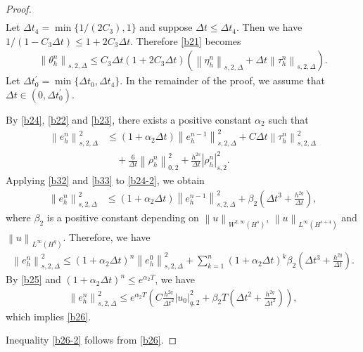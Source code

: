 \documentclass[10pt,a4paper,tbtags,leqno]{amsart}
\theoremstyle{definition}
\numberwithin{equation}{section}
\def\norm#1#2{\left\|#2\right\|_{#1}}
\def\snorm#1#2{\left|#2\right|_{#1}}
\begin{document}
\begin{proof}
\begin{align}
    \label{b21}
  \end{align}
  Let $ \Delta t_4 = \min \{1 / (2 C_{3}), 1\} $ and suppose $ \Delta t \leq \Delta t_4 $. 
  Then we have $ 1 / (1 - C_{3} \Delta t) \leq 1 + 2 C_{3} \Delta t $. 
  Therefore \eqref{b21} becomes 
  \begin{align}
    \norm{s, 2, \Delta}{\theta_h^n} \leq C_{3} \Delta t (1 + 2 C_{3} \Delta t) (\norm{s, 2, \Delta}{\eta_h^n} + \Delta t \norm{s, 2, \Delta}{\tau_h^n}). \label{b23}
  \end{align} 
  Let $ \Delta t_0^\prime = \min \{\Delta t_0, \Delta t_4\} $. In the remainder of the proof, we assume that $ \Delta t \in (0, \Delta t_0^\prime) $. 

  By \eqref{b24}, \eqref{b22} and \eqref{b23}, there exists a positive constant $ \alpha_2 $ such that 
  \begin{align} 
    \norm{s, 2, \Delta}{e_h^n}^2 & \leq (1 + \alpha_2 \Delta t) \norm{s, 2, \Delta}{e_h^{n - 1}}^2 + C \Delta t \norm{s, 2, \Delta}{\tau_h^n}^2 \\ & \quad + \frac{6}{\Delta t} \norm{0, 2}{\rho_h^n}^2 + \frac{h^{2s}}{\Delta t} \snorm{s, 2}{\rho_h^n}^2. \label{b24-2} 
  \end{align} 
  Applying \eqref{b32} and \eqref{b33} to \eqref{b24-2}, we obtain 
  \begin{align}
    \norm{s, 2, \Delta}{e_h^n}^2 
    & \leq (1 + \alpha_2 \Delta t) \norm{s, 2, \Delta}{e_h^{n - 1}}^2 + \beta_2 \left(\Delta t^3 + \frac{h^{2 q}}{\Delta t}\right), 
  \end{align} 
  where $ \beta_2 $ is a positive constant depending on $ \norm{W^{2, \infty}(H^s)}{u} $, $ \norm{L^{\infty}(H^{s + 4})}{u} $ and $ \norm{L^{\infty}(H^q)}{u} $. Therefore, we have 
  \begin{align} 
    \norm{s, 2, \Delta}{e_h^n}^2 \leq (1 + \alpha_2 \Delta t)^n \norm{s, 2, \Delta}{e_h^0}^2 + \sum_{k=1}^{n} (1 + \alpha_2 \Delta t)^k \beta_2 \left(\Delta t^3 + \frac{h^{2 q}}{\Delta t}\right). 
  \end{align} 
  By \eqref{b25} and $ (1 + \alpha_2 \Delta t)^n \leq e^{\alpha_2 T} $, we have 
  \begin{align} 
    \norm{s, 2, \Delta}{e_h^n}^2 \leq e^{\alpha_2 T} \left(C \frac{h^{2q}}{\Delta t^2} \snorm{q, 2}{u_0}^2 + \beta_2 T \left(\Delta t^2 + \frac{h^{2q}}{\Delta t^2}\right)\right), 
  \end{align} 
  which implies \eqref{b26}. 

  Inequality \eqref{b26-2} follows from \eqref{b26}. 
\end{proof} 
\end{document}
